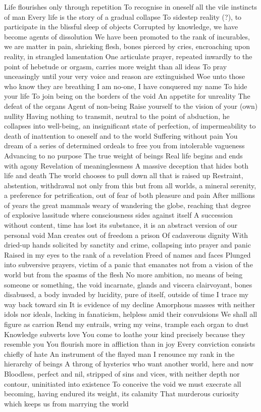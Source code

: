\documentclass{article}
\begin{document}
Life flourishes only through repetition
To recognise in oneself all the vile instincts of man
Every life is the story of a gradual collapse
To sidestep reality (?), to participate in the blissful sleep of objects
Corrupted by knowledge, we have become agents of dissolution
We have been promoted to the rank of incurables, we are matter in pain, shrieking flesh, bones pierced by cries, encroaching upon reality, in strangled lamentation
One articulate prayer, repeated inwardly to the point of hebetude or orgasm, carries more weight than all ideas
To pray unceasingly until your very voice and reason are extinguished
Woe unto those who know they are breathing
I am no-one, I have conquered my name
To hide your life
To join being on the borders of the void
An appetite for unreality
The defeat of the organs
Agent of non-being
Raise yourself to the vision of your (own) nullity
Having nothing to transmit, neutral to the point of abduction, he collapses into well-being, an insignificant state of perfection, of impermeability to death of inattention to oneself and to the world
Suffering without pain
You dream of a series of determined ordeals to free you from intolerable vagueness
Advancing to no purpose
The true weight of beings
Real life begins and ends with agony
Revelation of meaninglessness
A massive deception that hides both life and death
The world chooses to pull down all that is raised up
Restraint, abstention, withdrawal not only from this but from all worlds, a mineral serenity, a preference for petrification, out of fear of both pleasure and pain
After millions of years the great mammals weary of wandering the globe, reaching that degree of explosive lassitude where consciousness sides against itself
A succession without content, time has lost its substance, it is an abstract version of our personal void
Man creates out of freedom a prison
Of cadaverous dignity
With dried-up hands solicited by sanctity and crime, collapsing into prayer and panic
Raised in my eyes to the rank of a revelation
Freed of names and faces
Plunged into subversive prayers, victim of a panic that emanates not from a vision of the world but from the spasms of the flesh
No more ambition, no means of being someone or something, the void incarnate, glands and viscera clairvoyant, bones disabused, a body invaded by lucidity, pure of itself, outside of time
I trace my way back toward sin
It is evidence of my decline
Amorphous masses with neither idols nor ideals, lacking in fanaticism, helpless amid their convulsions
We shall all figure as carrion
Rend my entrails, wring my veins, trample each organ to dust
Knowledge subverts love
You come to loathe your kind precisely because they resemble you
You flourish more in affliction than in joy
Every conviction consists chiefly of hate
An instrument of the flayed man
I renounce my rank in the hierarchy of beings
A throng of hysterics who want another world, here and now
Bloodless, perfect and nil, stripped of sins and vices, with neither depth nor contour, uninitiated into existence
To conceive the void we must execrate all becoming, having endured its weight, its calamity
That murderous curiosity which keeps us from marrying the world
\fi
\end{document}
